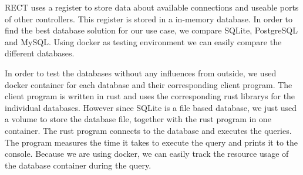 RECT uses a register to store data about available connections and useable ports of other controllers. This register is stored in a in-memory database. In order to find the 
best database solution for our use case, we compare SQLite, PostgreSQL and MySQL. Using docker as testing environment we can easily compare the different databases.

In order to test the databases without any influences from outside, we used docker container for each database and their corresponding client program. The client program
is written in rust and uses the corresponding rust librarys for the individual databases. However since SQLite is a file based database, we just used a volume to store the
database file, together with the rust program in one container. The rust program connects to the database and executes the queries. The program measures the time it 
takes to execute the query and prints it to the console. Because we are using docker, we can easily track the resource usage of the database container during the query. 

\filbreak